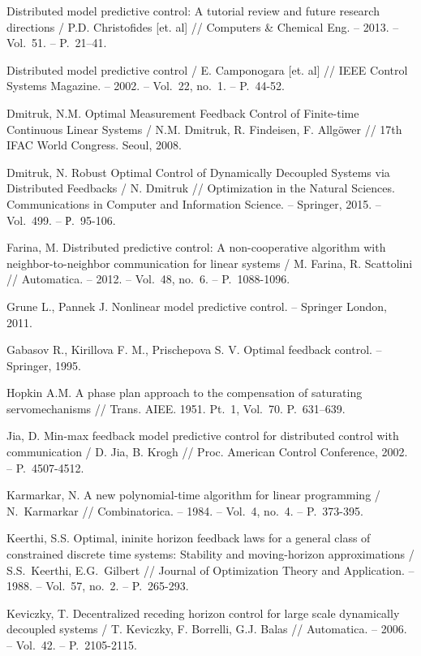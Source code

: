 \begin{biblio}
Distributed model predictive control: A tutorial review and future research directions / P.D. Christofides [et. al] // Computers \& Chemical Eng. -- 2013. -- Vol.~51. -- P.~21–41.

Distributed model predictive control / E. Camponogara [et. al] // IEEE Control Systems Magazine. --
2002. -- Vol.~22, no.~1. -- P.~44-52.

Dmitruk, N.M. Optimal Measurement Feedback Control of Finite-time Continuous Linear Systems / N.M.
Dmitruk, R. Findeisen, F. Allg{\"{o}}wer // 17th IFAC World Congress. Seoul, 2008.

Dmitruk, N. Robust Optimal Control of Dynamically Decoupled Systems via Distributed Feedbacks / N.
Dmitruk // Optimization in the Natural Sciences. Communications in Computer and Information Science. -- Springer, 2015. -- Vol.~499. -- Р.~95-106.

Farina, M. Distributed predictive control: A non-cooperative algorithm with neighbor-to-neighbor
communication for linear systems / M. Farina, R. Scattolini //  Automatica. -- 2012. -- Vol.~48, no.~6. -- P.~1088-1096.

Grune L., Pannek J. Nonlinear model predictive control. -- Springer London, 2011.

Gabasov R., Kirillova F. M., Prischepova S. V. Optimal feedback control. – Springer, 1995.

Hopkin A.M. A phase plan approach to the compensation of saturating servomechanisms //
Trans. AIEE. 1951. Pt.~1, Vol.~70. P.~631--639.

Jia, D. Min-max feedback model predictive control for distributed control  with communication / D.
Jia, B.  Krogh // Proc. American Control Conference, 2002. -- P.~4507-4512.

Karmarkar, N. A new polynomial-time algorithm for linear programming / N.~Karmarkar //
Combinatorica. -- 1984. -- Vol.~4, no.~4. -- P.~373-395.

Keerthi, S.S.  Optimal, ininite horizon feedback laws for a general class of constrained discrete
time systems: Stability and moving-horizon approximations / S.S.~Keerthi,   E.G.~Gilbert  //
Journal of Optimization Theory and Application. -- 1988. -- Vol.~{57}, no.~{2}. -- P.~{265-293}.

Keviczky, T. Decentralized  receding horizon control for large scale dynamically decoupled systems
/ T. Keviczky,  F. Borrelli, G.J.  Balas // Automatica. -- 2006. -- Vol.~42. -- P.~2105-2115.


\end{biblio}
